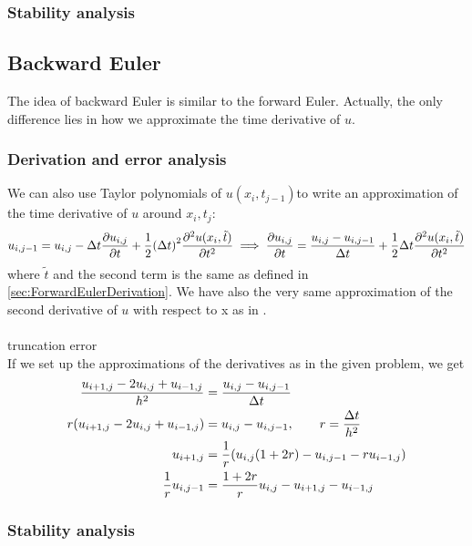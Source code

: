 \documentclass[12pt,english,a4paper]{article}
\begin{document}
\subsubsection{Stability analysis}



%
\subsection{Backward Euler}
The idea of backward Euler is similar to the forward Euler. Actually, the only difference lies in how we approximate the time derivative of \(u\). 
\subsubsection{Derivation and error analysis}
We can also use Taylor polynomials of \(u(x_i,t_{j-1})\)to write an approximation of the time derivative of \(u\) around \(x_i,t_j\):
\[
u_{i,j-1} = u_{i,j} - \Delta t\pdv{u_{i,j}}{t} + \frac{1}{2}\qty(\Delta t)^2\pdv[2]{u(x_i,\tilde{t})}{t} 
\implies \pdv{u_{i,j}}{t} = \frac{u_{i,j}-u_{i,j-1}}{\Delta t} + \frac{1}{2}\Delta t\pdv[2]{u(x_i,\tilde{t})}{t}
\]
where \(\tilde{t}\) and the second term is the same as defined in \vref{sec:ForwardEulerDerivation}. We have also the very same approximation of the second derivative of \(u\) with respect to x as in \autocite{oblig1}.\\
\hfill \\
truncation error 
\\
If we set up the approximations of the derivatives as in the given problem, we get
\begin{align*}
\frac{u_{i+1,j}  - 2u_{i,j} + u_{i-1,j}}{h^2} &= \frac{u_{i,j}-u_{i,j-1}}{\Delta t} \\
r(u_{i+1,j}  - 2u_{i,j} + u_{i-1,j})&=u_{i,j}-u_{i,j-1}, \quad\quad r = \frac{\Delta t}{h^2}\\
u_{i+1,j} &= \frac{1}{r}\qty(u_{i,j}(1+2r) - u_{i,j-1} - ru_{i-1,j}) \\
\frac{1}{r}u_{i,j-1}  &= \frac{1+2r}{r}u_{i,j}- u_{i+1,j}  - u_{i-1,j}
\end{align*}

\subsubsection{Stability analysis}
\end{document}
